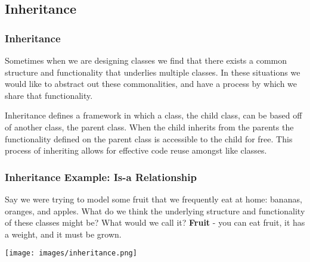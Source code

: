 \documentclass{beamer}
\begin{document}
\subsection{Inheritance}
\begin{frame}
  \frametitle{Inheritance}
  Sometimes when we are designing classes we find that there exists a common structure and functionality that underlies multiple classes. In these situations we would like to abstract out these commonalities, and have a process by which we share that functionality. \vspace{4mm}
  \pause

  Inheritance defines a framework in which a class, the child class, can be based off of another class, the parent class. When the child inherits from the parents the functionality defined on the parent class is accessible to the child for free. This process of inheriting allows for effective code reuse amongst like classes.
\end{frame}

\begin{frame}
  \frametitle{Inheritance Example: Is-a Relationship}
  Say we were trying to model some fruit that we frequently eat at home: bananas, oranges, and apples. What do we think the underlying structure and functionality of these classes might be? What would we call it? \pause \textbf{Fruit} - you can eat fruit, it has a weight, and it must be grown. \vspace{2mm}
  \pause
  \begin{center}
    \texttt{[image: images/inheritance.png]}
  \end{center}
\end{frame}
\end{document}
